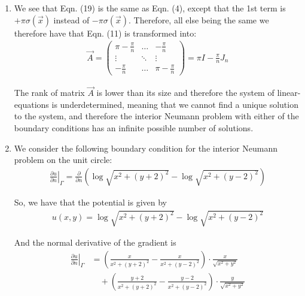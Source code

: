 \begin{enumerate}[label=(\alph*),leftmargin=*,itemsep=0mm]
    
    \item We see that Eqn. (19) is the same as Eqn. (4), except that the 1st term is $+\pi\sigma(\vec{x})$ instead of $-\pi\sigma(\vec{x})$.  Therefore, all else being the same we therefore have that Eqn. (11) is transformed into:
    \begin{align}
        \vec{A} = \begin{pmatrix} \pi - \frac{\pi}{n} & \dots & -\frac{\pi}{n} \\
        \vdots & \ddots & \vdots \\
        -\frac{\pi}{n} & \dots & \pi -\frac{\pi}{n} \end{pmatrix}
        = \pi I - \frac{\pi}{n} J_n
    \end{align}
    
    The rank of matrix $\vec{A}$ is lower than its size and therefore the system of linear-equations is underdetermined, meaning that we cannot find a unique solution to the system, and therefore the interior Neumann problem with either of the boundary conditions has an infinite possible number of solutions.
    
    \item We consider the following boundary condition for the interior Neumann problem on the unit circle:
    \begin{align}
        \left. \frac{\partial{u}}{\partial{n}} \right|_\Gamma
        = \frac{\partial}{\partial{n}}
        \left( \log \sqrt{x^2 + \left( y + 2 \right)^2}
        - \log \sqrt{x^2 + \left( y - 2 \right)^2} \right)
    \end{align}
    
    So, we have that the potential is given by
    \begin{align}
        u(x,y) = \log \sqrt{x^2 + \left( y + 2 \right)^2}
        - \log \sqrt{x^2 + \left( y - 2 \right)^2}
    \end{align}
    
    And the normal derivative of the gradient is
    \begin{align}
        \left. \frac{\partial{u}}{\partial{n}} \right|_\Gamma
        &= \left( \frac{x}{x^2+(y+2)^2} - \frac{x}{x^2+(y-2)^2} \right) \cdot \frac{x}{\sqrt{x^2+y^2}} \nonumber \\
        &\quad + \left( \frac{y+2}{x^2+(y+2)^2} - \frac{y-2}{x^2+(y-2)^2} \right) \cdot \frac{y}{\sqrt{x^2+y^2}}
    \end{align}
    

\end{enumerate}
